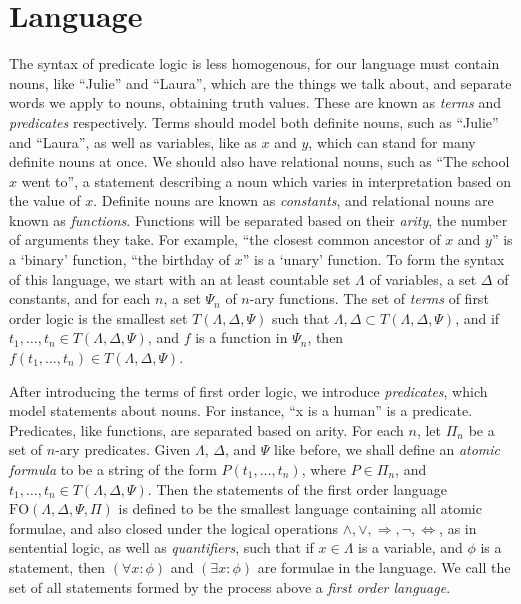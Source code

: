 \section{Language}

The syntax of predicate logic is less homogenous, for our language must contain nouns, like ``Julie'' and ``Laura'', which are the things we talk about, and separate words we apply to nouns, obtaining truth values. These are known as \emph{terms} and \emph{predicates} respectively. Terms should model both definite nouns, such as ``Julie'' and ``Laura'', as well as variables, like as $x$ and $y$, which can stand for many definite nouns at once. We should also have relational nouns, such as ``The school $x$ went to'', a statement describing a noun which varies in interpretation based on the value of $x$. Definite nouns are known as \emph{constants}, and relational nouns are known as \emph{functions}. Functions will be separated based on their \emph{arity}, the number of arguments they take. For example, ``the closest common ancestor of $x$ and $y$'' is a `binary' function, ``the birthday of $x$'' is a `unary' function. To form the syntax of this language, we start with an at least countable set $\Lambda$ of variables, a set $\Delta$ of constants, and for each $n$, a set $\Psi_n$ of $n$-ary functions. The set of \emph{terms} of first order logic is the smallest set $T(\Lambda, \Delta, \Psi)$ such that $\Lambda, \Delta \subset T(\Lambda, \Delta, \Psi)$, and if $t_1, \dots, t_n \in T(\Lambda, \Delta, \Psi)$, and $f$ is a function in $\Psi_n$, then $f(t_1, \dots, t_n) \in T(\Lambda, \Delta, \Psi)$.

After introducing the terms of first order logic, we introduce \emph{predicates}, which model statements about nouns. For instance, ``x is a human'' is a predicate. Predicates, like functions, are separated based on arity. For each $n$, let $\Pi_n$ be a set of $n$-ary predicates. Given $\Lambda$, $\Delta$, and $\Psi$ like before, we shall define an \emph{atomic formula} to be a string of the form $P(t_1, \dots, t_n)$, where $P \in \Pi_n$, and $t_1, \dots, t_n \in T(\Lambda, \Delta, \Psi)$. Then the statements of the first order language $\text{FO}(\Lambda, \Delta, \Psi, \Pi)$ is defined to be the smallest language containing all atomic formulae, and also closed under the logical operations $\wedge, \vee, \Rightarrow, \neg, \Leftrightarrow$, as in sentential logic, as well as \emph{quantifiers}, such that if $x \in \Lambda$ is a variable, and $\phi$ is a statement, then $(\forall x: \phi)$ and $(\exists x: \phi)$ are formulae in the language. We call the set of all statements formed by the process above a \emph{first order language}.

